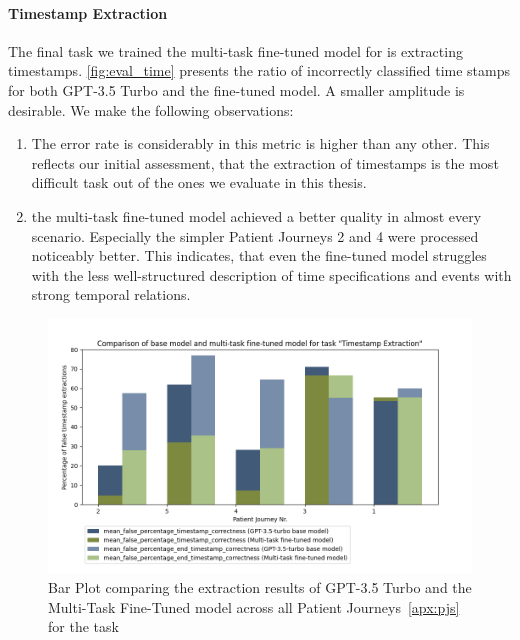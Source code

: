 \paragraph{Timestamp Extraction}
The final task we trained the multi-task fine-tuned model for is extracting timestamps. \autoref{fig:eval_time} presents the ratio of incorrectly classified time stamps for both GPT-3.5 Turbo and the fine-tuned model. A smaller amplitude is desirable. We make the following observations:
\begin{enumerate}
    \item The error rate is considerably in this metric is higher than any other. This reflects our initial assessment, that the extraction of timestamps is the most difficult task out of the ones we evaluate in this thesis.
    \item the multi-task fine-tuned model achieved a better quality in almost every scenario. Especially the simpler Patient Journeys 2 and 4 were processed noticeably better. This indicates, that even the fine-tuned model struggles with the less well-structured description of time specifications and events with strong temporal relations.
\end{enumerate}
\begin{figure}
    \centering
    \includegraphics[width=\textwidth]{bachelor_thesis/images/timestamp_all.png}
    \caption{Bar Plot comparing the extraction results of GPT-3.5 Turbo and the Multi-Task Fine-Tuned model across all Patient Journeys~\autoref{apx:pjs} for the task }
    \label{fig:eval_time}
\end{figure}



